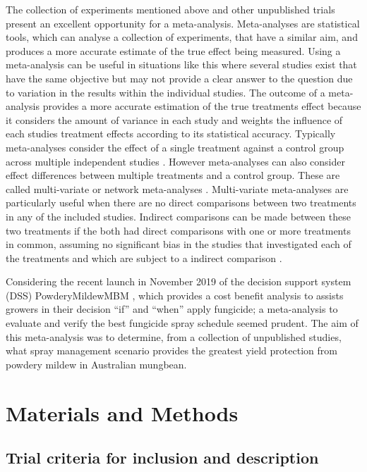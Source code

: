 \documentclass[agronomy,article,submit,moreauthors,pdftex]{mdpi}
\begin{document}
The collection of experiments mentioned above and other unpublished trials present an excellent opportunity for a meta-analysis.
Meta-analyses are statistical tools, which can analyse a collection of experiments, that have a similar aim, and produces a more accurate estimate of the true effect being measured.
Using a meta-analysis can be useful in situations like this where several studies exist that have the same objective but may not provide a clear answer to the question due to variation in the results within the individual studies.
The outcome of a meta-analysis provides a more accurate estimation of the true treatments effect because it considers the amount of variance in each study and weights the influence of each studies treatment effects according to its statistical accuracy.
Typically meta-analyses consider the effect of a single treatment against a control group across multiple independent studies \citep{Madden2011}.
However meta-analyses can also consider effect differences between multiple treatments and a control group.
These are called multi-variate or network meta-analyses \citep{MaddenEtAl2016}.
Multi-variate meta-analyses are particularly useful when there are no direct comparisons between two treatments in any of the included studies.
Indirect comparisons can be made between these two treatments if the both had direct comparisons with one or more treatments in common, assuming no significant bias in the studies that investigated each of the treatments and which are subject to a indirect comparison \citep{Jansen2011}.

Considering the recent launch in November 2019 of the decision support system (DSS) PowderyMildewMBM \citep{Diggle}, which provides a cost benefit analysis to assists growers in their decision ``if'' and ``when'' apply fungicide; a meta-analysis to evaluate and verify the best fungicide spray schedule seemed prudent.
The aim of this meta-analysis was to determine, from a collection of unpublished studies, what spray management scenario provides the greatest yield protection from powdery mildew in Australian mungbean.

\hypertarget{materials-and-methods}{%
\section{Materials and Methods}\label{materials-and-methods}}

\hypertarget{trial-criteria-for-inclusion-and-description}{%
\subsection{Trial criteria for inclusion and description}\label{trial-criteria-for-inclusion-and-description}}
\end{document}
